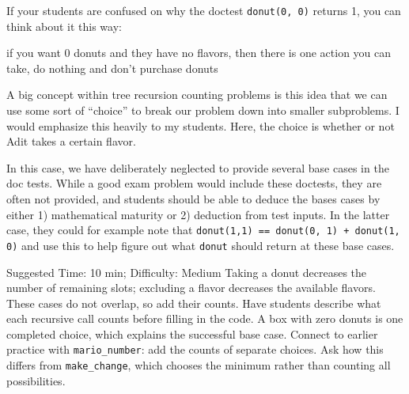 \begin{questionmeta}
If your students are confused on why the doctest \lstinline{donut(0, 0)} returns 1,
you can think about it this way:

if you want 0 donuts and they have no flavors, then there is one action you can take, do nothing and don't purchase donuts

A big concept within tree recursion counting problems is this idea that we can use some sort of ``choice'' to break our problem down into smaller subproblems. I would emphasize this heavily to my students. Here, the choice is whether or not Adit takes a certain flavor.

In this case, we have deliberately neglected to provide several base cases in the doc tests. While a good exam problem would include these doctests, they are often not provided, and students should be able to deduce the bases cases by either 1) mathematical maturity or 2) deduction from test inputs. In the latter case, they could for example note that \lstinline{donut(1,1) == donut(0, 1) + donut(1, 0)} and use this to help figure out what \lstinline{donut} should return at these base cases.

\end{questionmeta}

\begin{questionmeta}
    Suggested Time: 10 min; Difficulty: Medium
    Taking a donut decreases the number of remaining slots; excluding a flavor decreases the available flavors. These cases do not overlap, so add their counts. Have students describe what each recursive call counts before filling in the code. A box with zero donuts is one completed choice, which explains the successful base case. Connect to earlier practice with \lstinline{mario_number}: add the counts of separate choices. Ask how this differs from \lstinline{make_change}, which chooses the minimum rather than counting all possibilities.
\end{questionmeta}
